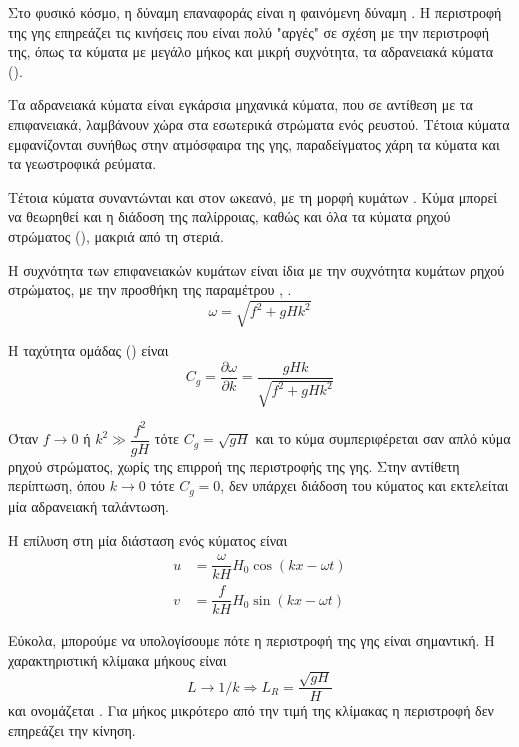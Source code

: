 Στο φυσικό κόσμο, η δύναμη επαναφοράς είναι η φαινόμενη δύναμη . Η περιστροφή της γης επηρεάζει τις κινήσεις που είναι πολύ "αργές" σε σχέση με την περιστροφή της, όπως τα κύματα με μεγάλο μήκος και μικρή συχνότητα, τα αδρανειακά κύματα ().

Τα αδρανειακά κύματα είναι εγκάρσια μηχανικά κύματα, που σε αντίθεση με τα επιφανειακά, λαμβάνουν χώρα στα εσωτερικά στρώματα ενός ρευστού. Τέτοια κύματα εμφανίζονται συνήθως στην ατμόσφαιρα της γης, παραδείγματος χάρη τα κύματα  και τα γεωστροφικά ρεύματα.

Τέτοια κύματα συναντώνται και στον ωκεανό, με τη μορφή κυμάτων . Κύμα  μπορεί να θεωρηθεί και η διάδοση της παλίρροιας, καθώς και όλα τα κύματα ρηχού στρώματος (), μακριά από τη στεριά.

Η συχνότητα των επιφανειακών κυμάτων  είναι ίδια με την συχνότητα κυμάτων ρηχού στρώματος, με την προσθήκη της παραμέτρου , .
\begin{equation}
	ω = \sqrt{f^2+gHk^2}
\end{equation}

Η ταχύτητα ομάδας () είναι
\begin{equation}
	C_g = \dfrac{\partial{ω}}{\partial{k}} = \dfrac{gHk}{\sqrt{f^2+gHk^2}}
\end{equation}

Όταν $f \rightarrow 0$ ή $k^2 \gg \dfrac{f^2}{gH}$ τότε $C_g=\sqrt{gH}$ και το κύμα συμπεριφέρεται σαν απλό κύμα ρηχού στρώματος, χωρίς της επιρροή της περιστροφής της γης. Στην αντίθετη περίπτωση, όπου $k \rightarrow 0$ τότε $C_g = 0$, δεν υπάρχει διάδοση του κύματος και εκτελείται μία αδρανειακή ταλάντωση.

Η επίλυση στη μία διάσταση ενός κύματος  είναι
\begin{align}
	u &= \dfrac{ω}{kH}H_0\cos(kx-ωt) \\
	v &= \dfrac{f}{kH}H_0\sin(kx-ωt)
\end{align}

Εύκολα, μπορούμε να υπολογίσουμε πότε η περιστροφή της γης είναι σημαντική. Η χαρακτηριστική κλίμακα μήκους είναι
\begin{equation}
	L \rightarrow 1/k \Rightarrow L_R = \dfrac{\sqrt{gH}}{H}
\end{equation}
και ονομάζεται \textbf{}. Για μήκος μικρότερο από την τιμή της κλίμακας η περιστροφή δεν επηρεάζει την κίνηση.

